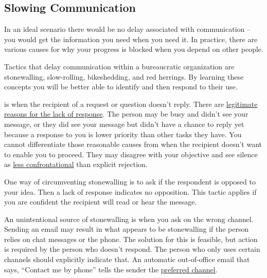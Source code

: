 \subsection*{Slowing Communication\label{sec:slowing-communication}}

In an ideal scenario there would be no delay associated with communication -- you would get the information you need when you need it. In practice, there are various causes for why your progress is blocked when you depend on other people. 

Tactics that delay communication within a bureaucratic organization are stonewalling, slow-rolling, bikeshedding, and red herrings. By learning these concepts you will be better able to identify and then respond to their use.

\iftoggle{glossarysubstitutionworks}{\Gls{stonewalling}}{Stonewalling} 
is when the recipient of a request or question  doesn't reply. There are \hyperref[sec:email-responsiveness]{legitimate reasons for the lack of response}. 
The person may be busy and didn't see your message, or they did see your message but didn't have a chance to reply yet because a response to you is lower priority than other tasks they have. You cannot differentiate those reasonable causes from when the recipient doesn't want to enable you to proceed. They may disagree with your objective and see silence as \href{https://en.wikipedia.org/wiki/Passive-aggressive_behavior}{less confrontational}
than explicit rejection. 

One way of circumventing stonewalling is to ask if the respondent is opposed to your idea. 
Then a lack of response indicates no opposition. This tactic applies if you are confident the recipient will read or hear the message.

An unintentional source of stonewalling is when you ask on the wrong channel. Sending an email may result in what appears to be stonewalling if the person relies on chat messages or the phone. The solution for this 
is feasible, but action is required by the person who doesn't respond. The person who only uses certain channels should explicitly indicate that. An automatic out-of-office email that says, ``Contact me by phone'' tells the sender the \hyperref[sec:communication-preferences]{preferred channel}. 

